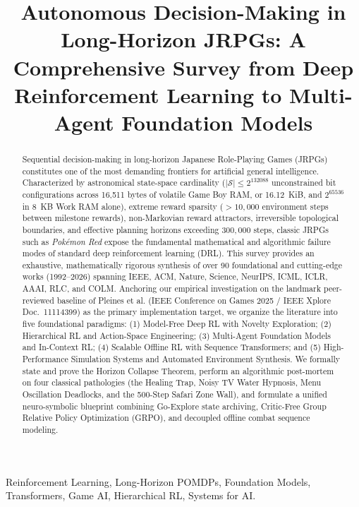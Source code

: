 \documentclass[journal,10pt,twocolumn]{IEEEtran}
\begin{document}
\title{Autonomous Decision-Making in Long-Horizon JRPGs: A Comprehensive Survey from Deep Reinforcement Learning to Multi-Agent Foundation Models}

\author{}

\maketitle

\begin{abstract}
Sequential decision-making in long-horizon Japanese Role-Playing Games (JRPGs) constitutes one of the most demanding frontiers for artificial general intelligence. Characterized by astronomical state-space cardinality ($|\mathcal{S}| \le 2^{132088}$ unconstrained bit configurations across 16,511 bytes of volatile Game Boy RAM, or 16.12~KiB, and $2^{65536}$ in 8~KB Work RAM alone), extreme reward sparsity ($>10{,}000$ environment steps between milestone rewards), non-Markovian reward attractors, irreversible topological boundaries, and effective planning horizons exceeding $300{,}000$ steps, classic JRPGs such as \textit{Pok{\'e}mon Red} expose the fundamental mathematical and algorithmic failure modes of standard deep reinforcement learning (DRL). This survey provides an exhaustive, mathematically rigorous synthesis of over 90 foundational and cutting-edge works (1992--2026) spanning IEEE, ACM, Nature, Science, NeurIPS, ICML, ICLR, AAAI, RLC, and COLM. Anchoring our empirical investigation on the landmark peer-reviewed baseline of Pleines et al. (IEEE Conference on Games 2025 / IEEE Xplore Doc.~11114399) as the primary implementation target, we organize the literature into five foundational paradigms: (1) Model-Free Deep RL with Novelty Exploration; (2) Hierarchical RL and Action-Space Engineering; (3) Multi-Agent Foundation Models and In-Context RL; (4) Scalable Offline RL with Sequence Transformers; and (5) High-Performance Simulation Systems and Automated Environment Synthesis. We formally state and prove the Horizon Collapse Theorem, perform an algorithmic post-mortem on four classical pathologies (the Healing Trap, Noisy TV Water Hypnosis, Menu Oscillation Deadlocks, and the 500-Step Safari Zone Wall), and formulate a unified neuro-symbolic blueprint combining Go-Explore state archiving, Critic-Free Group Relative Policy Optimization (GRPO), and decoupled offline combat sequence modeling.
\end{abstract}

\begin{IEEEkeywords}
Reinforcement Learning, Long-Horizon POMDPs, Foundation Models, Transformers, Game AI, Hierarchical RL, Systems for AI.
\end{IEEEkeywords}
\end{document}

